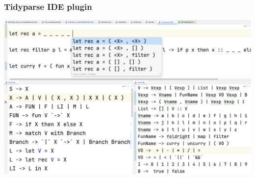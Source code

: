 \documentclass{beamer}
\begin{document}
    \begin{frame}[fragile]
        \frametitle{Tidyparse IDE plugin}
        \href{https://github.com/breandan/tidyparse}{\includegraphics[width=\textwidth]{../figures/tidyparse.png}}
    \end{frame}
\end{document}
